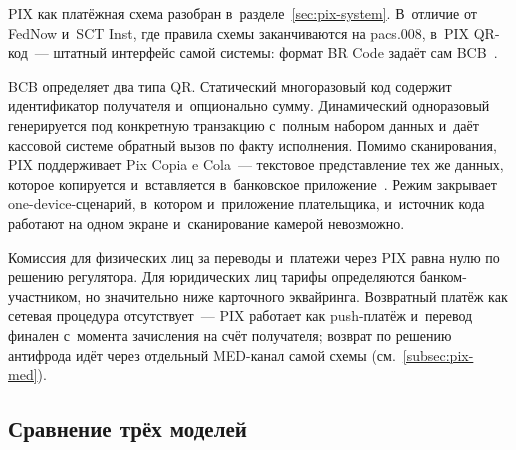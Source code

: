 PIX как платёжная схема разобран в~разделе~\ref{sec:pix-system}.
В~отличие от FedNow и~SCT Inst, где правила схемы заканчиваются
на pacs.008, в~PIX QR-код~--- штатный интерфейс самой системы:
формат BR Code задаёт сам BCB~\cite{pix-manual-iniciacao}.

BCB определяет два типа QR. Статический многоразовый код содержит
идентификатор получателя и~опционально сумму. Динамический одноразовый
генерируется под конкретную транзакцию с~полным набором данных и~даёт
кассовой системе обратный вызов по факту исполнения. Помимо сканирования,
PIX поддерживает Pix Copia e Cola~--- текстовое представление тех же
данных, которое копируется и~вставляется в~банковское
приложение~\cite{pix-faq}. Режим закрывает one-device-сценарий, в~котором
и~приложение плательщика, и~источник кода работают на одном экране
и~сканирование камерой невозможно.

Комиссия для физических лиц за переводы и~платежи через PIX
равна нулю по решению регулятора. Для юридических лиц
тарифы определяются банком-участником, но значительно ниже
карточного эквайринга. Возвратный платёж как сетевая процедура
отсутствует~--- PIX работает как push-платёж и~перевод финален
с~момента зачисления на счёт получателя; возврат по решению антифрода идёт через
отдельный MED-канал самой схемы (см.~\ref{subsec:pix-med}).

\subsection*{Сравнение трёх моделей}

